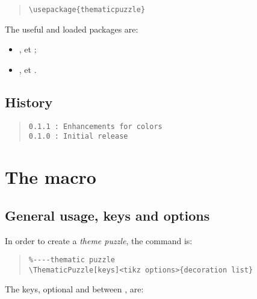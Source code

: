 \documentclass[11pt,a4paper]{ltxdoc}
\begin{document}
\begin{quote}
\begin{verbatim}
\usepackage{thematicpuzzle}
\end{verbatim}
\end{quote}

The useful and loaded packages are:

\begin{itemize}
	\item {},  et  ;
	\item {},  et .
\end{itemize}

\vfill

\subsection{History}

\begin{quote}
\begin{verbatim}
0.1.1 : Enhancements for colors
0.1.0 : Initial release
\end{verbatim}
\end{quote}

\pagebreak

\section{The macro}

\subsection{General usage, keys and options}

In order to create a \textit{theme puzzle}, the command is:

\begin{quote}
\begin{verbatim}
%----thematic puzzle
\ThematicPuzzle[keys]<tikz options>{decoration list}
\end{verbatim}
\end{quote}

The \textsf{keys}, optional and between \MontreCode{[...]}, are:
\end{document}
